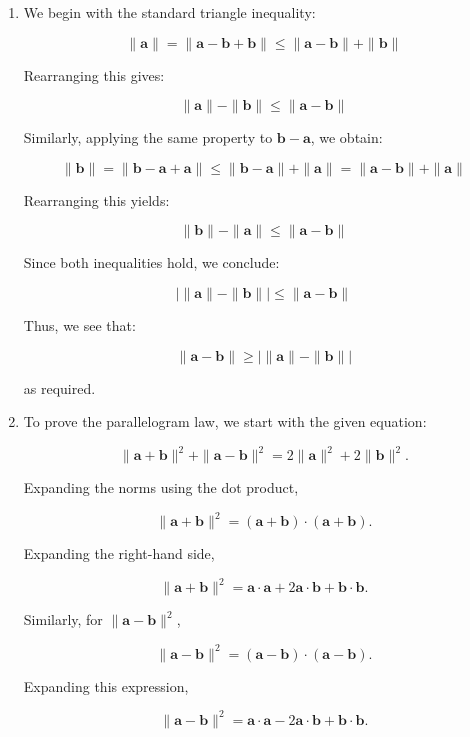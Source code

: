 \documentclass[12pt]{article}
\begin{document}
\begin{enumerate}
\item We begin with the standard triangle inequality:

\[
\|\mathbf{a}\| = \|\mathbf{a} - \mathbf{b} + \mathbf{b}\| \leq \|\mathbf{a} - \mathbf{b}\| + \|\mathbf{b}\|
\]

Rearranging this gives:

\[
\|\mathbf{a}\| - \|\mathbf{b}\| \leq \|\mathbf{a} - \mathbf{b}\|
\]

Similarly, applying the same property to \(\mathbf{b} - \mathbf{a}\), we obtain:

\[
\|\mathbf{b}\| = \|\mathbf{b} - \mathbf{a} + \mathbf{a}\| \leq \|\mathbf{b} - \mathbf{a}\| + \|\mathbf{a}\| = \|\mathbf{a} - \mathbf{b}\| + \|\mathbf{a}\|
\]

Rearranging this yields:

\[
\|\mathbf{b}\| - \|\mathbf{a}\| \leq \|\mathbf{a} - \mathbf{b}\|
\]

Since both inequalities hold, we conclude:

\[
|\|\mathbf{a}\| - \|\mathbf{b}\|| \leq \|\mathbf{a} - \mathbf{b}\|
\]

Thus, we see that:

\[
\|\mathbf{a} - \mathbf{b}\| \geq |\|\mathbf{a}\| - \|\mathbf{b}\||
\]

as required.


\item 
To prove the parallelogram law, we start with the given equation:

\[
\|\mathbf{a} + \mathbf{b}\|^2 + \|\mathbf{a} - \mathbf{b}\|^2 = 2\|\mathbf{a}\|^2 + 2\|\mathbf{b}\|^2.
\]

Expanding the norms using the dot product,

\[
\|\mathbf{a} + \mathbf{b}\|^2 = (\mathbf{a} + \mathbf{b}) \cdot (\mathbf{a} + \mathbf{b}).
\]

Expanding the right-hand side,

\[
\|\mathbf{a} + \mathbf{b}\|^2 = \mathbf{a} \cdot \mathbf{a} + 2 \mathbf{a} \cdot \mathbf{b} + \mathbf{b} \cdot \mathbf{b}.
\]

Similarly, for \(\|\mathbf{a} - \mathbf{b}\|^2\),

\[
\|\mathbf{a} - \mathbf{b}\|^2 = (\mathbf{a} - \mathbf{b}) \cdot (\mathbf{a} - \mathbf{b}).
\]

Expanding this expression,

\[
\|\mathbf{a} - \mathbf{b}\|^2 = \mathbf{a} \cdot \mathbf{a} - 2 \mathbf{a} \cdot \mathbf{b} + \mathbf{b} \cdot \mathbf{b}.
\]


\end{enumerate}
\end{document}
